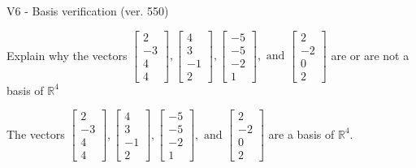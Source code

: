 \begin{exercise}
  \begin{exerciseTitle}V6 - Basis verification (ver. 550)\end{exerciseTitle}
  \begin{exerciseStatement}
    Explain why the vectors \(\left[\begin{array}{r}
2 \\
-3 \\
4 \\
4
\end{array}\right] , \left[\begin{array}{r}
4 \\
3 \\
-1 \\
2
\end{array}\right] , \left[\begin{array}{r}
-5 \\
-5 \\
-2 \\
1
\end{array}\right] , \text{ and } \left[\begin{array}{r}
2 \\
-2 \\
0 \\
2
\end{array}\right]\) are or are not a basis of \(\mathbb{R}^4\)	


  \end{exerciseStatement}
  \begin{exerciseAnswer}
   The vectors \(\left[\begin{array}{r}
2 \\
-3 \\
4 \\
4
\end{array}\right] , \left[\begin{array}{r}
4 \\
3 \\
-1 \\
2
\end{array}\right] , \left[\begin{array}{r}
-5 \\
-5 \\
-2 \\
1
\end{array}\right] , \text{ and } \left[\begin{array}{r}
2 \\
-2 \\
0 \\
2
\end{array}\right]\) 
  	 are  a basis of \(\mathbb{R}^4\).
  


  \end{exerciseAnswer}
\end{exercise}